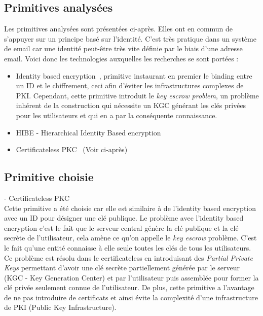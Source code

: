 \subsection{Primitives analysées}
Les primitives analysées sont présentées ci-après. Elles ont en commun de s'appuyer sur un principe basé sur l'identité. C'est très pratique dans un système de email car une identité peut-être très vite définie par le biais d'une adresse email. Voici donc les technologies auxquelles les recherches se sont portées :
\begin{itemize}
	\item Identity based encryption~\cite{conf/crypto/Shamir84}, primitive instaurant en premier le binding entre un ID et le chiffrement, ceci afin d'éviter les infrastructures complexes de PKI. Cependant, cette primitive introduit le \textit{key escrow problem}, un problème inhérent de la construction qui nécessite un KGC générant les clés privées pour les utilisateurs et qui en a par la conséquente connaissance.
	\item HIBE - Hierarchical Identity Based encryption~\cite{conf/eurocrypt/HorwitzL02}
	\item Certificateless PKC~\cite{conf/asiacrypt/Al-RiyamiP03} (Voir ci-après)
\end{itemize}
\subsection{Primitive choisie}
- Certificateless PKC~\cite{conf/asiacrypt/Al-RiyamiP03}\\
 Cette primitive a été choisie car elle est similaire à de l'identity based encryption avec un ID pour désigner une clé publique. Le problème avec l'identity based encryption c'est le fait que le serveur central génère la clé publique et la clé secrète de l'utilisateur, cela amène ce qu'on appelle le \textit{key escrow} problème. C'est le fait qu'une entité connaisse à elle seule toutes les clés de tous les utilisateurs. Ce problème est résolu dans le certificateless en introduisant des \textit{Partial Private Keys} permettant d'avoir une clé secrète partiellement générée par le serveur (KGC - Key Generation Center) et par l'utilisateur puis assemblée pour former la clé privée seulement connue de l'utilisateur. De plus, cette primitive a l'avantage de ne pas introduire de certificats et ainsi évite la complexité d'une infrastructure de PKI (Public Key Infrastructure).
